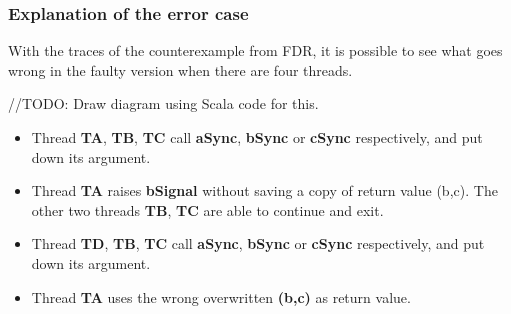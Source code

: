 \documentclass{article}
\begin{document}
\subsubsection{Explanation of the error case}
With the traces of the counterexample from FDR, it is possible to see what goes wrong in the faulty version when there are four threads.

//TODO: Draw diagram using Scala code for this.
\begin{itemize}
    \item Thread \textbf{TA}, \textbf{TB}, \textbf{TC} call \textbf{aSync}, \textbf{bSync} or \textbf{cSync} respectively, and put down its argument.
    \item Thread \textbf{TA} raises \textbf{bSignal} without saving a copy of return value {(b,c)}. The other two threads \textbf{TB}, \textbf{TC} are able to continue and exit. 
    \item Thread \textbf{TD}, \textbf{TB}, \textbf{TC} call \textbf{aSync}, \textbf{bSync} or \textbf{cSync} respectively, and put down its argument.
    \item Thread \textbf{TA} uses the wrong overwritten \textbf{(b,c)} as return value. 
\end{itemize}
\end{document}
